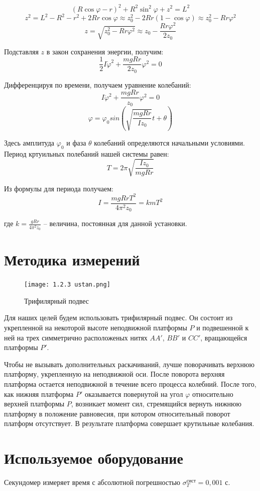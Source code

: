 \documentclass[a4paper,12pt]{article}
\begin{document}
    $$(R\cos\varphi - r)^2 + R^2\sin^2\varphi + z^2 = L^2$$
    $$ z^2 = L^2 - R^2 - r^2 + 2Rr\cos\varphi \approx z^2_{0} - 2Rr(1 - \cos\varphi) \approx z^2_{0} - Rr\varphi^2 $$
	$$ z = \sqrt{z^2_{0} - Rr\varphi^2} \approx z_{0} - \frac{Rr\varphi^2}{2z_{0}} $$ \par
    Подставляя $z$ в закон сохранения энергии, получим:
    $$\frac{1}{2}I\dot\varphi^2 + \frac{mgRr}{2z_0}\varphi^2 = 0$$ \par
    Дифференцируя по времени, получаем уравнение колебаний:
    $$I\ddot\varphi^2 + \frac{mgRr}{z_0}\varphi^2 = 0$$
    $$\varphi = \varphi_0 sin \left(\sqrt{\frac{mgRr}{Iz_0}}t + \theta\right)$$ \par
    Здесь амплитуда $\varphi_0$ и фаза $\theta$ колебаний определяются начальными условиями. Период кртуильных полебаний нашей системы равен:
	$$T = 2\pi \sqrt{\frac{Iz_0}{mgRr}}$$ \par
    Из формулы для периода получаем:
    $$I = \frac{mgRrT^2}{4 \pi^2z_0} = kmT^2$$ \par
	где $k = \frac{gRr}{4\pi^2z_0}$ -- величина, постоянная для данной установки.

\section{Методика измерений}
    \begin{figure}
        \texttt{[image: 1.2.3 ustan.png]}
        \caption{Трифилярный подвес}
    \end{figure}

    Для наших целей будем использовать трифилярный подвес. Он состоит из укрепленной на некоторой высоте неподвижной платформы $P$ и подвешенной к ней на трех симметрично расположеных нитях $AA'$, $BB'$ и $CC'$, вращающейся платформы $P'$. \par
    Чтобы не вызывать дополнительных раскачиваний, лучше поворачивать верхнюю платформу, укрепленную на неподвижной оси. После поворота верхняя платформа остается неподвижной в течение всего процесса колебний. После того, как нижняя платформа $P'$ оказывается повернутой на угол $\varphi$ относительно верхней платформы $P$, возникает момент сил, стремящийся вернуть нижнюю платформу в положение равновесия, при котором относительный поворот платформ отсутствует. В результате платформа совершает крутильные колебания. 


\section{Используемое оборудование}
    Секундомер измеряет время с абсолютной погрешностью $\sigma_T^{\text{сист}} = 0,001$ с.
\end{document}
